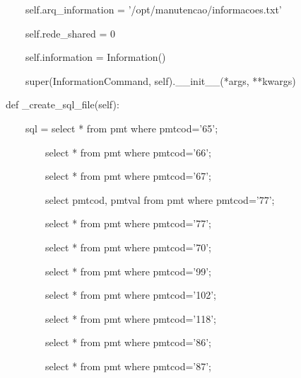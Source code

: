 {\ttfamily\color[rgb]{0.10980392,0.10980392,0.10980392}
    \ \ \ \ \ \ \ \ self.arq\_information = '/opt/manutencao/informacoes.txt'}

{\ttfamily\color[rgb]{0.10980392,0.10980392,0.10980392}
    \ \ \ \ \ \ \ \ self.rede\_shared = 0}

{\ttfamily\color[rgb]{0.10980392,0.10980392,0.10980392}
    \ \ \ \ \ \ \ \ self.information = Information()}


    \bigskip

{\ttfamily\color[rgb]{0.10980392,0.10980392,0.10980392}
    \ \ \ \ \ \ \ \ super(InformationCommand, self).\_\_init\_\_(*args, **kwargs)}


    \bigskip

{\ttfamily\color[rgb]{0.10980392,0.10980392,0.10980392}
    \ \ \ \ def \_create\_sql\_file(self):}

{\ttfamily\color[rgb]{0.10980392,0.10980392,0.10980392}
    \ \ \ \ \ \ \ \ sql = {\textquotedbl}{\textquotedbl}{\textquotedbl}select * from pmt where pmtcod='65';}

{\ttfamily\color[rgb]{0.10980392,0.10980392,0.10980392}
    \ \ \ \ \ \ \ \ \ \ \ \ select * from pmt where pmtcod='66';}

{\ttfamily\color[rgb]{0.10980392,0.10980392,0.10980392}
    \ \ \ \ \ \ \ \ \ \ \ \ select * from pmt where pmtcod='67';}

{\ttfamily\color[rgb]{0.10980392,0.10980392,0.10980392}
    \ \ \ \ \ \ \ \ \ \ \ \ select pmtcod, pmtval from pmt where pmtcod='77';}

{\ttfamily\color[rgb]{0.10980392,0.10980392,0.10980392}
    \ \ \ \ \ \ \ \ \ \ \ \ select * from pmt where pmtcod='77';}

{\ttfamily\color[rgb]{0.10980392,0.10980392,0.10980392}
    \ \ \ \ \ \ \ \ \ \ \ \ select * from pmt where pmtcod='70';}

{\ttfamily\color[rgb]{0.10980392,0.10980392,0.10980392}
    \ \ \ \ \ \ \ \ \ \ \ \ select * from pmt where pmtcod='99';}

{\ttfamily\color[rgb]{0.10980392,0.10980392,0.10980392}
    \ \ \ \ \ \ \ \ \ \ \ \ select * from pmt where pmtcod='102';}

{\ttfamily\color[rgb]{0.10980392,0.10980392,0.10980392}
    \ \ \ \ \ \ \ \ \ \ \ \ select * from pmt where pmtcod='118';}

{\ttfamily\color[rgb]{0.10980392,0.10980392,0.10980392}
    \ \ \ \ \ \ \ \ \ \ \ \ select * from pmt where pmtcod='86';}

{\ttfamily\color[rgb]{0.10980392,0.10980392,0.10980392}
    \ \ \ \ \ \ \ \ \ \ \ \ select * from pmt where pmtcod='87';{\textquotedbl}{\textquotedbl}{\textquotedbl}}


